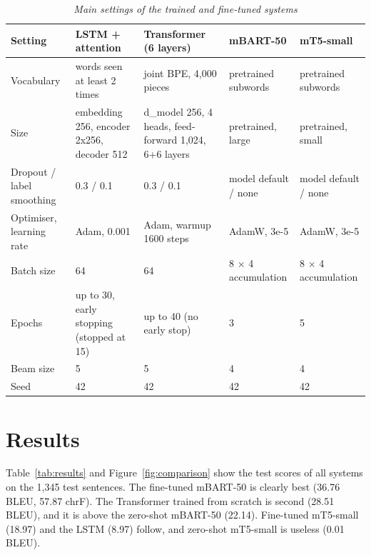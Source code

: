 \documentclass[11pt,a4paper]{article}
\begin{document}
\begin{table}[t]
\caption{\textit{Main settings of the trained and fine-tuned systems}}\label{tab:settings}
\centering
\begin{tabular}{>{\raggedright\arraybackslash\scriptsize}p{}>{\raggedright\arraybackslash\scriptsize}p{}>{\raggedright\arraybackslash\scriptsize}p{}>{\raggedright\arraybackslash\scriptsize}p{}>{\raggedright\arraybackslash\scriptsize}p{}}
\hline\hline
\textbf{Setting} & \textbf{LSTM + attention} & \textbf{Transformer (6 layers)} & \textbf{mBART-50} & \textbf{mT5-small} \\
\hline
Vocabulary & words seen at least 2 times & joint BPE, 4,000 pieces & pretrained subwords & pretrained subwords \\
Size & embedding 256, encoder 2x256, decoder 512 & d\_model 256, 4 heads, feed-forward 1,024, 6+6 layers & pretrained, large & pretrained, small \\
Dropout / label smoothing & 0.3 / 0.1 & 0.3 / 0.1 & model default / none & model default / none \\
Optimiser, learning rate & Adam, 0.001 & Adam, warmup 1600 steps & AdamW, 3e-5 & AdamW, 3e-5 \\
Batch size & 64 & 64 & 8 \ensuremath{\times} 4 accumulation & 8 \ensuremath{\times} 4 accumulation \\
Epochs & up to 30, early stopping (stopped at 15) & up to 40 (no early stop) & 3 & 5 \\
Beam size & 5 & 5 & 4 & 4 \\
Seed & 42 & 42 & 42 & 42 \\
\hline\hline
\end{tabular}
\end{table}
\section{Results}
Table~\ref{tab:results} and Figure~\ref{fig:comparison} show the test scores of all systems on the 1,345 test sentences. The fine-tuned mBART-50 is clearly best (36.76 BLEU, 57.87 chrF). The Transformer trained from scratch is second (28.51 BLEU), and it is above the zero-shot mBART-50 (22.14). Fine-tuned mT5-small (18.97) and the LSTM (8.97) follow, and zero-shot mT5-small is useless (0.01 BLEU).
\end{document}

